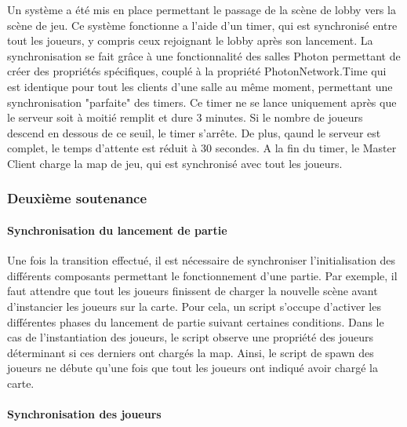             Un système a été mis en place permettant le passage de la scène de lobby vers la scène de jeu.
            Ce système fonctionne a l'aide d'un timer, qui est synchronisé entre tout les joueurs, y compris ceux
            rejoignant le lobby après son lancement. La synchronisation se fait grâce à une fonctionnalité des salles Photon
            permettant de créer des propriétés spécifiques, couplé à la propriété PhotonNetwork.Time qui
            est identique pour tout les clients d'une salle au même moment, permettant une synchronisation
            "parfaite" des timers.
            Ce timer ne se lance uniquement après que le serveur soit à moitié remplit et dure 3 minutes. Si le nombre de joueurs descend en dessous de ce seuil, le timer s'arrête. De plus, qaund le serveur
            est complet, le temps d'attente est réduit à 30 secondes.
            A la fin du timer, le Master Client charge la map de jeu, qui est synchronisé avec tout les joueurs.


    \vspace{0.5cm}
    \subsubsection{Deuxième soutenance}
    \vspace{0.5cm}

        \paragraph{Synchronisation du lancement de partie}
        
            Une fois la transition effectué, il est nécessaire de synchroniser l'initialisation des différents composants
            permettant le fonctionnement d'une partie. Par exemple, il faut attendre que tout les joueurs finissent de charger
            la nouvelle scène avant d'instancier les joueurs sur la carte. Pour cela, un script s'occupe d'activer les différentes phases
            du lancement de partie suivant certaines conditions. Dans le cas de l'instantiation des joueurs, le script observe une propriété
            des joueurs déterminant si ces derniers ont chargés la map. Ainsi, le script de spawn des joueurs ne débute qu'une fois que tout les joueurs
            ont indiqué avoir chargé la carte.


        \paragraph{Synchronisation des joueurs}


